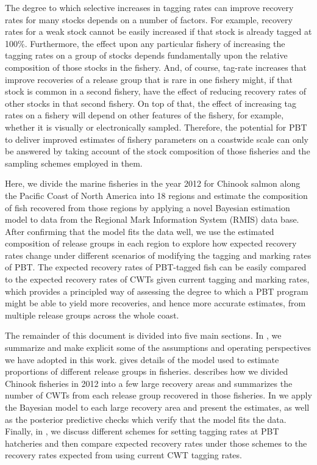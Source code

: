 \documentclass[11pt]{article}
\begin{document}
The degree to which selective increases in tagging rates can improve recovery rates for many 
stocks depends on a number of factors.  For example, recovery rates for a weak stock cannot be 
easily increased if that stock is already tagged at 100\%.  Furthermore,
the effect upon any particular fishery of increasing the tagging rates on a group of stocks depends
fundamentally upon the relative composition of those stocks in the fishery.  And, of course,
tag-rate increases that improve recoveries of a release group that is rare in one fishery might,
if that stock is common in a second fishery, have the effect of reducing recovery rates of other
stocks in that second fishery.  On top of that, the effect of increasing tag rates on a fishery will
depend on other features of the fishery, for example, whether it is visually or electronically sampled.
Therefore, the potential for PBT to deliver improved estimates of fishery parameters on a coastwide scale
can only be answered by taking account of the stock composition of those fisheries and the sampling
schemes employed in them.  

Here, we divide the marine fisheries in the year 2012 for Chinook salmon along
the Pacific Coast of North America into
18 regions and estimate the composition of fish recovered from those regions by applying a novel
Bayesian estimation model to data from the Regional Mark Information System (RMIS) data base.  After
confirming that the model fits the data well, we use the estimated composition of release groups
in each region to explore how expected recovery rates change under different scenarios of modifying the 
tagging and marking rates of PBT.  The expected recovery rates of PBT-tagged fish can be easily compared
to the expected recovery rates of CWTs given current tagging and marking rates, which provides a principled
way of assessing the degree to which a PBT program might be able to yield more recoveries, 
and hence more accurate estimates, from multiple release groups across the whole coast.   


The remainder of this document is divided into five main sections.  In {\sc {}},
we summarize and make explicit some of the assumptions and operating perspectives we have adopted
in this work.  {\sc {}} gives details of the model used to estimate
proportions of different release groups in fisheries.  {\sc {}} describes how we divided
Chinook fisheries in 2012 into a few large recovery areas and summarizes the number of CWTs from
each release group recovered in those fisheries. In {\sc {}} we apply the
Bayesian model to each large recovery area and present the estimates, as well as the posterior
predictive checks which verify that the model fits the data.  Finally, in
{\sc{}}, we discuss different schemes for setting tagging rates at
PBT hatcheries and then compare expected recovery rates under those schemes to the recovery
rates expected from using current CWT tagging rates.  
\end{document}
